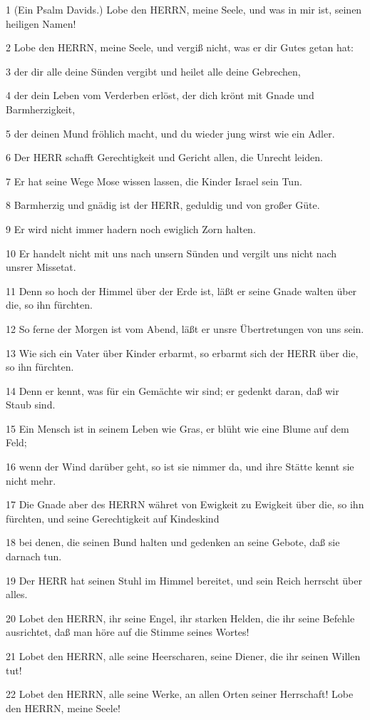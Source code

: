 \par 1 (Ein Psalm Davids.) Lobe den HERRN, meine Seele, und was in mir ist, seinen heiligen Namen!
\par 2 Lobe den HERRN, meine Seele, und vergiß nicht, was er dir Gutes getan hat:
\par 3 der dir alle deine Sünden vergibt und heilet alle deine Gebrechen,
\par 4 der dein Leben vom Verderben erlöst, der dich krönt mit Gnade und Barmherzigkeit,
\par 5 der deinen Mund fröhlich macht, und du wieder jung wirst wie ein Adler.
\par 6 Der HERR schafft Gerechtigkeit und Gericht allen, die Unrecht leiden.
\par 7 Er hat seine Wege Mose wissen lassen, die Kinder Israel sein Tun.
\par 8 Barmherzig und gnädig ist der HERR, geduldig und von großer Güte.
\par 9 Er wird nicht immer hadern noch ewiglich Zorn halten.
\par 10 Er handelt nicht mit uns nach unsern Sünden und vergilt uns nicht nach unsrer Missetat.
\par 11 Denn so hoch der Himmel über der Erde ist, läßt er seine Gnade walten über die, so ihn fürchten.
\par 12 So ferne der Morgen ist vom Abend, läßt er unsre Übertretungen von uns sein.
\par 13 Wie sich ein Vater über Kinder erbarmt, so erbarmt sich der HERR über die, so ihn fürchten.
\par 14 Denn er kennt, was für ein Gemächte wir sind; er gedenkt daran, daß wir Staub sind.
\par 15 Ein Mensch ist in seinem Leben wie Gras, er blüht wie eine Blume auf dem Feld;
\par 16 wenn der Wind darüber geht, so ist sie nimmer da, und ihre Stätte kennt sie nicht mehr.
\par 17 Die Gnade aber des HERRN währet von Ewigkeit zu Ewigkeit über die, so ihn fürchten, und seine Gerechtigkeit auf Kindeskind
\par 18 bei denen, die seinen Bund halten und gedenken an seine Gebote, daß sie darnach tun.
\par 19 Der HERR hat seinen Stuhl im Himmel bereitet, und sein Reich herrscht über alles.
\par 20 Lobet den HERRN, ihr seine Engel, ihr starken Helden, die ihr seine Befehle ausrichtet, daß man höre auf die Stimme seines Wortes!
\par 21 Lobet den HERRN, alle seine Heerscharen, seine Diener, die ihr seinen Willen tut!
\par 22 Lobet den HERRN, alle seine Werke, an allen Orten seiner Herrschaft! Lobe den HERRN, meine Seele!

